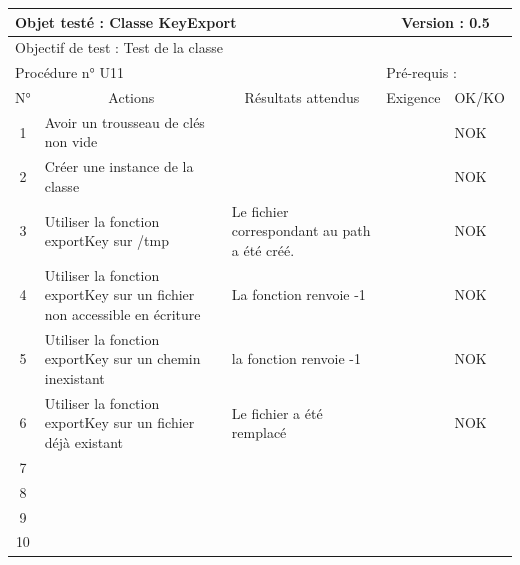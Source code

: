 \documentclass{../res/univ-projet}
\begin{document}
\begin{center}
    \begin{tabular}{|c|p{5cm}|p{5cm}|p{1.5cm}|p{1.5cm}|}
      \hline
      \multicolumn{3}{|l|}{Objet testé : Classe KeyExport} & \multicolumn{2}{c|}{Version : 0.5}\\ \hline
      \multicolumn{5}{|l|}{Objectif de test : Test de la classe}\\ \hline
      \multicolumn{3}{|l|}{Procédure n° U11} & \multicolumn{2}{p{3cm}|}{Pré-requis : }\\ \hline
      \multicolumn{1}{|c|}{N°} & \multicolumn{1}{c|}{Actions} & \multicolumn{1}{c|}{Résultats attendus} & 
      \multicolumn{1}{c|}{Exigence} & \multicolumn{1}{c|}{OK/KO}\\ \hline
      1 & Avoir un trousseau de clés non vide &  &  & NOK \\
      2 & Créer une instance de la classe &  &  & NOK \\
      3 & Utiliser la fonction exportKey sur /tmp & Le fichier correspondant au path a été créé. &  & NOK \\
      4 & Utiliser la fonction exportKey sur un fichier non accessible en écriture & La fonction renvoie -1 &  & NOK \\
      5 & Utiliser la fonction exportKey sur un chemin inexistant & la fonction renvoie -1 &  & NOK \\
      6 & Utiliser la fonction exportKey sur un fichier déjà existant & Le fichier a été remplacé &  & NOK \\
      7 &  &  &  & \\
      8 &  &  &  & \\
      9 &  &  &  & \\
      10 &  &  &  & \\ 
  \hline
    \end{tabular}
    \vskip 2.2cm


\end{center}
\end{document}

